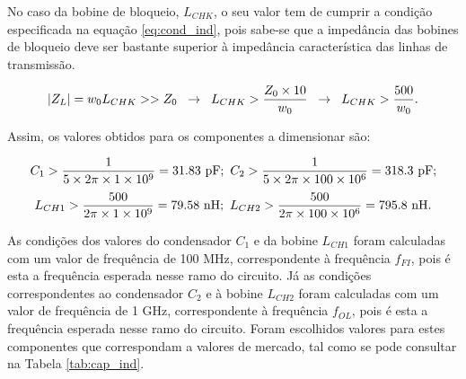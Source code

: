 \documentclass[11pt]{article}
\numberwithin{equation}{section}
\begin{document}
\vspace{1mm}
No caso da bobine de bloqueio, $L_{CHK}$, o seu valor tem de cumprir a condição especificada na equação \ref{eq:cond_ind}, pois sabe-se que a impedância das bobines de bloqueio deve ser bastante superior à impedância característica das linhas de transmissão.  

\vspace{-3mm}
\begin{equation}
	\lvert Z_L \rvert = w_{0} L_{CHK} >> Z_0 \hspace{2mm} \rightarrow \hspace{2mm} L_{CHK} > \frac{Z_0 \times 10}{w_{0}} \hspace{2mm} \rightarrow \hspace{2mm} L_{CHK} > \frac{500}{w_{0}}.
	\label{eq:cond_ind}
\end{equation}

\vspace{1mm}

Assim, os valores obtidos para os componentes a dimensionar são:

\vspace{-3mm}
\begin{equation}
\centering
C_{1} > \frac{1}{5 \times 2 \pi \times 1 \times 10^{9}} = 31.83~\text{pF};~ C_{2} > \frac{1}{5 \times 2\pi \times 100 \times 10^{6}} = 318.3~\text{pF}; 
\end{equation}
\vspace{-3mm}
\begin{equation}
\centering
L_{CH1} > \frac{500}{2\pi \times 1 \times 10^{9}} = 79.58~\text{nH};~L_{CH2} > \frac{500}{2\pi \times 100 \times 10^{6}} = 795.8~\text{nH}.
\end{equation}

\vspace{2mm}
As condições dos valores do condensador $ C_{1} $ e da bobine $ L_{CH1} $ foram calculadas com um valor de frequência de 100 MHz, correspondente à frequência $f_{FI}$, pois é esta a frequência esperada nesse ramo do circuito. Já as condições correspondentes ao condensador $ C_{2} $ e à bobine $ L_{CH2} $ foram calculadas com um valor de frequência de 1 GHz, correspondente à frequência $ f_{OL} $, pois é esta a frequência esperada nesse ramo do circuito. Foram escolhidos valores para estes componentes que correspondam a valores de mercado, tal como se pode consultar	 na Tabela \ref{tab:cap_ind}.
\end{document}
